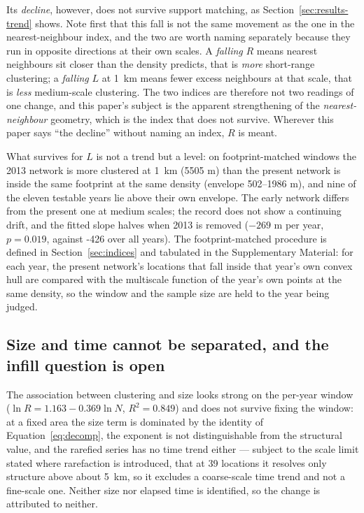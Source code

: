 \documentclass{article}
\newcommand{\rRareLocN}{39}
\newcommand{\lKmExact}{-426}
\begin{document}
Its \emph{decline}, however, does not survive support matching, as
Section~\ref{sec:results-trend} shows. Note first that this fall is not the same movement as the
one in the nearest-neighbour index, and the two are worth naming separately because they run in
opposite directions at their own scales. A \emph{falling} $R$ means nearest neighbours sit
closer than the density predicts, that is \emph{more} short-range clustering; a \emph{falling}
$L$ at \SI{1}{\kilo\meter} means fewer excess neighbours at that scale, that is \emph{less}
medium-scale clustering. The two indices are therefore not two readings of one change, and
this paper's subject is the apparent strengthening of the \emph{nearest-neighbour} geometry,
which is the index that does not survive. Wherever this paper says ``the decline'' without naming
an index, $R$ is meant.

What survives for $L$ is not a trend but a level: on
footprint-matched windows the 2013 network is more clustered at \SI{1}{\kilo\meter}
(\num{5505} m) than the present network is inside the same footprint at the same density
(envelope \num{502}--\num{1986} m), and nine of the eleven testable years lie above their own
envelope. The early network differs from the present one at medium scales; the record does not
show a continuing drift, and the fitted slope halves when 2013 is removed
($-269$ m per year, $p = 0.019$, against \lKmExact{} over all years). The footprint-matched
procedure is defined in Section~\ref{sec:indices} and tabulated in the Supplementary Material:
for each year, the present network's locations that fall inside that year's own convex hull are
compared with the multiscale function of the year's own points at the same density, so the window
and the sample size are held to the year being judged.

\subsection{Size and time cannot be separated, and the infill question is open}
\label{sec:results-powerlaw}

The association between clustering and size looks strong on the per-year window
($\ln R = 1.163 - 0.369\ln N$, $R^2 = 0.849$) and does not survive fixing the window: at a fixed
area the size term is dominated by the identity of Equation~\eqref{eq:decomp}, the exponent is
not distinguishable from the structural value, and the rarefied series has no time trend
either --- subject to the scale limit stated where rarefaction is introduced, that at
\rRareLocN{} locations it resolves only structure above about \SI{5}{\kilo\meter}, so it
excludes a coarse-scale time trend and not a fine-scale one.
Neither size nor elapsed time is identified, so the change is attributed to neither.
\end{document}
